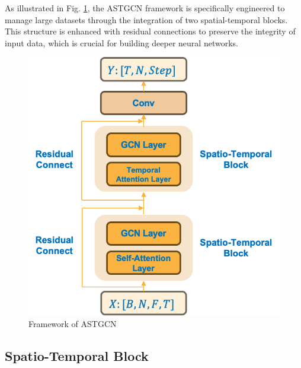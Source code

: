 \documentclass[conference]{IEEEtran}
\begin{document}
As illustrated in Fig. \ref{fig:ASTGCN}, the ASTGCN framework is specifically engineered to manage large datasets through the integration of two spatial-temporal blocks. This structure is enhanced with residual connections to preserve the integrity of input data, which is crucial for building deeper neural networks.


\begin{figure}[h]
    \includegraphics[width=0.8\linewidth]{ASTGCN.png}
    \caption{Framework of ASTGCN}
    \label{fig:ASTGCN}
\end{figure}



\subsection{Spatio-Temporal Block}
\end{document}
